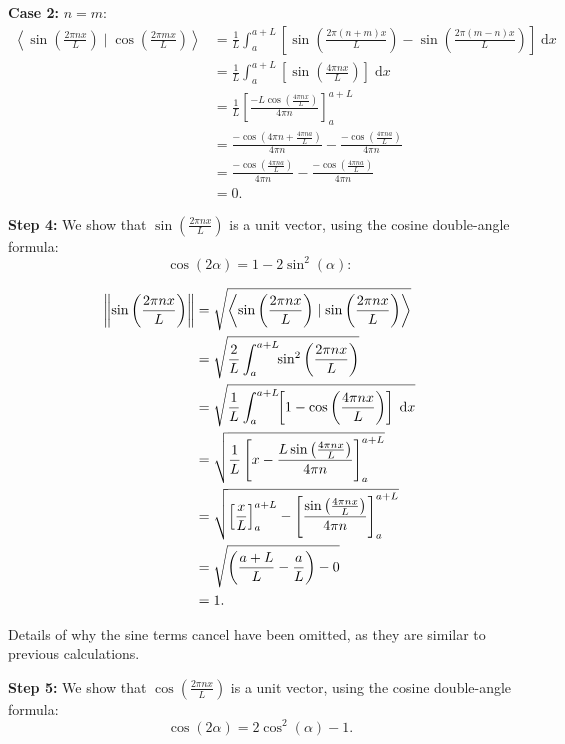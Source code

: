 \documentclass{article}
\newcommand{\diff}{\;\mathrm{d}}
\newcommand{\norm}[1]{\left|\kern-1pt\left|#1\right|\kern-1pt\right|}
\newcommand{\braket}[2]{\left\langle #1 \mid #2 \right\rangle}
\begin{document}
\textbf{Case 2:} $n=m$:
\begin{align*}
	\braket{\sin\left(\frac{2\pi nx}{L}\right)}{\cos\left(\frac{2\pi mx}{L}\right)} &= \frac{1}{L}\int_a^{a+L}\!\!\left[\sin\left(\frac{2\pi (n+m)x}{L}\right)-\sin\left(\frac{2\pi (m-n)x}{L}\right)\right]\diff x\\
	&=\frac{1}{L}\int_a^{a+L}\!\!\left[\sin\left(\frac{4\pi nx}{L}\right)\right]\diff x\\
	&= \frac{1}{L}\left[\frac{-L\cos\left(\frac{4\pi nx}{L}\right)}{4\pi n}\right]_a^{a+L}\\
	&=\frac{-\cos\left(4\pi n + \frac{4\pi na}{L}\right)}{4\pi n} - \frac{-\cos\left(\frac{4\pi na}{L}\right)}{4\pi n}\\
	&=\frac{-\cos\left(\frac{4\pi na}{L}\right)}{4\pi n}-\frac{-\cos\left(\frac{4\pi na}{L}\right)}{4\pi n}\\
	&=0.
\end{align*}

\bigskip





\noindent\textbf{Step 4:} We show that $\sin\left(\frac{2\pi nx}{L}\right)$ is a unit vector, using the cosine double-angle formula:
\[\cos(2\alpha)=1-2\sin^2(\alpha):\]

\begin{align*}
	\norm{\sin\left(\frac{2\pi nx}{L}\right)}&=\sqrt{\braket{\sin\left(\frac{2\pi nx}{L}\right)}{\sin\left(\frac{2\pi nx}{L}\right)}}\\
	&=\sqrt{\frac{2}{L}\int_a^{a+L}\!\! \sin^2\left(\frac{2\pi nx}{L}\right) }\\
	&=\sqrt{\frac{1}{L}\int_a^{a+L}\!\! \left[1-\cos\left(\frac{4\pi nx}{L}\right)\right]\diff x}\\
	&=\sqrt{\frac{1}{L}\left[x-\frac{L\sin\left(\frac{4\pi nx}{L}\right)}{4\pi n}\right]_a^{a+L}}\\
	&=\sqrt{\left[\frac{x}{L}\right]_a^{a+L}-\left[\frac{\sin\left(\frac{4\pi nx}{L}\right)}{4\pi n}\right]_a^{a+L}}\\
	&=\sqrt{\left(\frac{a+L}{L}-\frac{a}{L}\right) -0}\\
	&=1.
\end{align*}

Details of why the sine terms cancel have been omitted, as they are similar to previous calculations.\bigskip





\noindent\textbf{Step 5:} We show that $\cos\left(\frac{2\pi nx}{L}\right)$ is a unit vector, using the cosine double-angle formula:
\[\cos(2\alpha)=2\cos^2(\alpha)-1.\]
\end{document}
